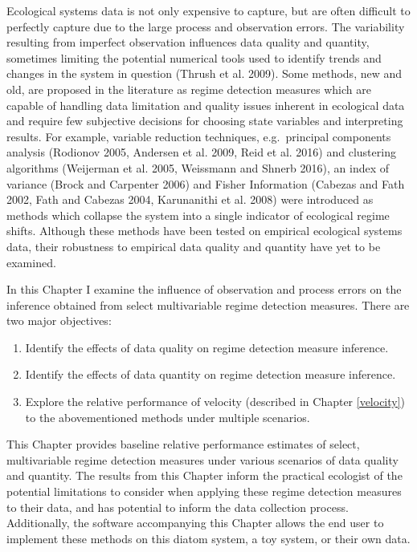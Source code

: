 \documentclass[12pt,twoside,openany]{reedthesis}
\begin{document}
Ecological systems data is not only expensive to capture, but are often
difficult to perfectly capture due to the large process and observation
errors. The variability resulting from imperfect observation influences
data quality and quantity, sometimes limiting the potential numerical
tools used to identify trends and changes in the system in question
(Thrush et al. 2009). Some methods, new and old, are proposed in the
literature as regime detection measures which are capable of handling
data limitation and quality issues inherent in ecological data and
require few subjective decisions for choosing state variables and
interpreting results. For example, variable reduction techniques,
e.g.~principal components analysis (Rodionov 2005, Andersen et al. 2009,
Reid et al. 2016) and clustering algorithms (Weijerman et al. 2005,
Weissmann and Shnerb 2016), an index of variance (Brock and Carpenter
2006) and Fisher Information (Cabezas and Fath 2002, Fath and Cabezas
2004, Karunanithi et al. 2008) were introduced as methods which collapse
the system into a single indicator of ecological regime shifts. Although
these methods have been tested on empirical ecological systems data,
their robustness to empirical data quality and quantity have yet to be
examined.

In this Chapter I examine the influence of observation and process
errors on the inference obtained from select multivariable regime
detection measures. There are two major objectives:
\begin{enumerate}
\def\labelenumi{\arabic{enumi}.}
\item
  Identify the effects of data quality on regime detection measure
  inference.
\item
  Identify the effects of data quantity on regime detection measure
  inference.
\item
  Explore the relative performance of velocity (described in Chapter
  \ref{velocity}) to the abovementioned methods under multiple
  scenarios.
\end{enumerate}
This Chapter provides baseline relative performance estimates of select,
multivariable regime detection measures under various scenarios of data
quality and quantity. The results from this Chapter inform the practical
ecologist of the potential limitations to consider when applying these
regime detection measures to their data, and has potential to inform the
data collection process. Additionally, the software accompanying this
Chapter allows the end user to implement these methods on this diatom
system, a toy system, or their own data.
\end{document}
